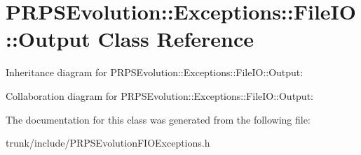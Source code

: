 \hypertarget{class_p_r_p_s_evolution_1_1_exceptions_1_1_file_i_o_1_1_output}{\section{P\-R\-P\-S\-Evolution\-:\-:Exceptions\-:\-:File\-I\-O\-:\-:Output Class Reference}
\label{class_p_r_p_s_evolution_1_1_exceptions_1_1_file_i_o_1_1_output}
}


Inheritance diagram for P\-R\-P\-S\-Evolution\-:\-:Exceptions\-:\-:File\-I\-O\-:\-:Output\-:


Collaboration diagram for P\-R\-P\-S\-Evolution\-:\-:Exceptions\-:\-:File\-I\-O\-:\-:Output\-:


The documentation for this class was generated from the following file\-:\begin{DoxyCompactItemize}
\item 
trunk/include/P\-R\-P\-S\-Evolution\-F\-I\-O\-Exceptions.\-h\end{DoxyCompactItemize}
